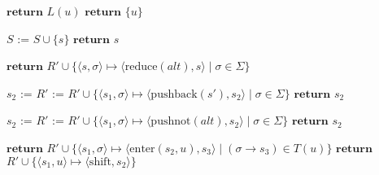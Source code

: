 \documentclass[12pt]{article}
\begin{document}
\begin{algorithmic}
            \State $\mathbf{return}$ $L(u)$
        \Else
            \State $\mathbf{return}$ $\{u\}$
        \EndIf
    \EndProcedure

        \State $S$ := $S \cup \{s\}$
        \State $\mathbf{return}$ $s$
    \EndProcedure

        \State $\mathbf{return}$ $R' \cup \{\langle s, \sigma\rangle \mapsto \langle \mathrm{reduce}(\mathit{alt}), s\rangle \mid \sigma \in \Sigma\}$
    \EndProcedure

        \State $s_2$ := 
        \State $R'$ := $R' \cup \{\langle s_1, \sigma\rangle \mapsto \langle\mathrm{pushback}(s'), s_2\rangle \mid \sigma \in \Sigma\}$
        \State $\mathbf{return}$ $s_2$
    \EndProcedure

        \State $s_2$ :=  
        \State $R'$ := $R' \cup \{\langle s_1, \sigma\rangle \mapsto \langle\mathrm{pushnot}(\mathit{alt}), s_2\rangle \mid \sigma \in \Sigma\}$
        \State $\mathbf{return}$ $s_2$
    \EndProcedure

            \State $\mathbf{return}$ $R' \cup \{\langle s_1, \sigma\rangle \mapsto \langle\mathrm{enter}(s_2, u), s_3\rangle \mid (\sigma \to s_3) \in T(u) \}$
        \Else
            \State $\mathbf{return}$ $R' \cup \{\langle s_1, u\rangle \mapsto \langle\mathrm{shift}, s_2\rangle\}$
        \EndIf
    \EndProcedure
\end{algorithmic}
\end{document}
